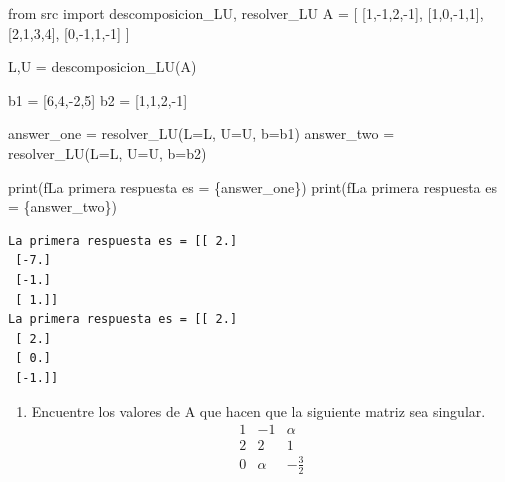 \documentclass[
  letterpaper,
  DIV=11,
  numbers=noendperiod]{scrartcl}
\newenvironment{Shaded}{\begin{snugshade}}{\end{snugshade}}
\newcommand{\BuiltInTok}[1]{\textcolor[rgb]{0.00,0.23,0.31}{#1}}
\newcommand{\DecValTok}[1]{\textcolor[rgb]{0.68,0.00,0.00}{#1}}
\newcommand{\ImportTok}[1]{\textcolor[rgb]{0.00,0.46,0.62}{#1}}
\newcommand{\NormalTok}[1]{\textcolor[rgb]{0.00,0.23,0.31}{#1}}
\newcommand{\OperatorTok}[1]{\textcolor[rgb]{0.37,0.37,0.37}{#1}}
\newcommand{\SpecialCharTok}[1]{\textcolor[rgb]{0.37,0.37,0.37}{#1}}
\newcommand{\SpecialStringTok}[1]{\textcolor[rgb]{0.13,0.47,0.30}{#1}}
\providecommand{\tightlist}{%
  \setlength{\itemsep}{0pt}\setlength{\parskip}{0pt}}\usepackage{longtable,booktabs,array}
\begin{document}
\begin{Shaded}
\begin{Highlighting}[]
\ImportTok{from}\NormalTok{ src }\ImportTok{import}\NormalTok{ descomposicion\_LU, resolver\_LU}
\NormalTok{A }\OperatorTok{=}\NormalTok{ [}
\NormalTok{    [}\DecValTok{1}\NormalTok{,}\OperatorTok{{-}}\DecValTok{1}\NormalTok{,}\DecValTok{2}\NormalTok{,}\OperatorTok{{-}}\DecValTok{1}\NormalTok{],}
\NormalTok{    [}\DecValTok{1}\NormalTok{,}\DecValTok{0}\NormalTok{,}\OperatorTok{{-}}\DecValTok{1}\NormalTok{,}\DecValTok{1}\NormalTok{],}
\NormalTok{    [}\DecValTok{2}\NormalTok{,}\DecValTok{1}\NormalTok{,}\DecValTok{3}\NormalTok{,}\DecValTok{4}\NormalTok{],}
\NormalTok{    [}\DecValTok{0}\NormalTok{,}\OperatorTok{{-}}\DecValTok{1}\NormalTok{,}\DecValTok{1}\NormalTok{,}\OperatorTok{{-}}\DecValTok{1}\NormalTok{]}
\NormalTok{]}

\NormalTok{L,U }\OperatorTok{=}\NormalTok{ descomposicion\_LU(A)}

\NormalTok{b1 }\OperatorTok{=}\NormalTok{ [}\DecValTok{6}\NormalTok{,}\DecValTok{4}\NormalTok{,}\OperatorTok{{-}}\DecValTok{2}\NormalTok{,}\DecValTok{5}\NormalTok{]}
\NormalTok{b2 }\OperatorTok{=}\NormalTok{ [}\DecValTok{1}\NormalTok{,}\DecValTok{1}\NormalTok{,}\DecValTok{2}\NormalTok{,}\OperatorTok{{-}}\DecValTok{1}\NormalTok{]}

\NormalTok{answer\_one }\OperatorTok{=}\NormalTok{ resolver\_LU(L}\OperatorTok{=}\NormalTok{L, U}\OperatorTok{=}\NormalTok{U, b}\OperatorTok{=}\NormalTok{b1)}
\NormalTok{answer\_two }\OperatorTok{=}\NormalTok{ resolver\_LU(L}\OperatorTok{=}\NormalTok{L, U}\OperatorTok{=}\NormalTok{U, b}\OperatorTok{=}\NormalTok{b2)}

\BuiltInTok{print}\NormalTok{(}\SpecialStringTok{f\textquotesingle{}La primera respuesta es = }\SpecialCharTok{\{}\NormalTok{answer\_one}\SpecialCharTok{\}}\SpecialStringTok{\textquotesingle{}}\NormalTok{)}
\BuiltInTok{print}\NormalTok{(}\SpecialStringTok{f\textquotesingle{}La primera respuesta es = }\SpecialCharTok{\{}\NormalTok{answer\_two}\SpecialCharTok{\}}\SpecialStringTok{\textquotesingle{}}\NormalTok{)}
\end{Highlighting}
\end{Shaded}

\begin{verbatim}
La primera respuesta es = [[ 2.]
 [-7.]
 [-1.]
 [ 1.]]
La primera respuesta es = [[ 2.]
 [ 2.]
 [ 0.]
 [-1.]]
\end{verbatim}

\begin{enumerate}
\def\labelenumi{\arabic{enumi}.}
\setcounter{enumi}{3}
\tightlist
\item
  Encuentre los valores de A que hacen que la siguiente matriz sea
  singular. \[
  \begin{matrix}
  1 & -1 & \alpha \\
  2 & 2 & 1 \\
  0 & \alpha & -\frac{3}{2}
  \end{matrix}
  \]
\end{enumerate}
\end{document}
